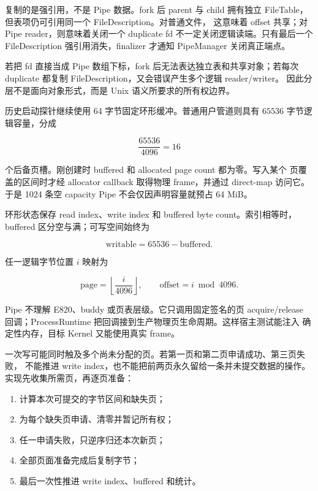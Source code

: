  复制的是强引用，不是 Pipe 数据。fork 后 parent 与 child
拥有独立 FileTable，但表项仍可引用同一个 FileDescription。对普通文件，
这意味着 offset 共享；对 Pipe reader，则意味着关闭一个 duplicate fd
不一定关闭逻辑读端。只有最后一个 FileDescription 强引用消失，finalizer
才通知 PipeManager 关闭真正端点。

若把 fd 直接当成 Pipe 数组下标，fork 后无法表达独立表和共享对象；若每次
duplicate 都复制 FileDescription，又会错误产生多个逻辑 reader/writer。
因此分层不是面向对象形式，而是 Unix 语义所要求的所有权边界。

历史启动探针继续使用 64 字节固定环形缓冲。普通用户管道则具有
\(65536\) 字节逻辑容量，分成

\[
  \frac{65536}{4096}=16
\]

个后备页槽。刚创建时 buffered 和 allocated page count 都为零。写入某个
页覆盖的区间时才经 allocator callback 取得物理 frame，并通过 direct-map
访问它。于是 1024 条空 capacity Pipe 不会仅因声明容量就预占 64 MiB。

环形状态保存 read index、write index 和 buffered byte count。索引相等时，
buffered 区分空与满；可写空间始终为

\[
  \mathrm{writable}=65536-\mathrm{buffered}.
\]

任一逻辑字节位置 \(i\) 映射为

\[
  \mathrm{page}=\left\lfloor\frac{i}{4096}\right\rfloor,\qquad
  \mathrm{offset}=i\bmod4096.
\]

Pipe 不理解 E820、buddy 或页表层级。它只调用固定签名的页 acquire/release
回调；ProcessRuntime 把回调接到生产物理页生命周期。这样宿主测试能注入
确定性内存，目标 Kernel 又能使用真实 frame。

一次写可能同时触及多个尚未分配的页。若第一页和第二页申请成功、第三页失败，
不能推进 write index，也不能把前两页永久留给一条并未提交数据的操作。
实现先收集所需页，再逐页准备：

\begin{enumerate}[label=\arabic*.]
  \item 计算本次可提交的字节区间和缺失页；
  \item 为每个缺失页申请、清零并暂记所有权；
  \item 任一申请失败，只逆序归还本次新页；
  \item 全部页面准备完成后复制字节；
  \item 最后一次性推进 write index、buffered 和统计。
\end{enumerate}

